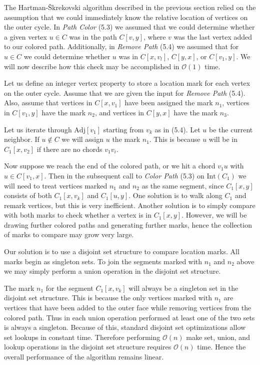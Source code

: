 \documentclass[letterpaper, 12pt]{article}
\theoremstyle{thm}
\begin{document}
The Hartman-\v{S}krekovski algorithm described in the previous section relied on the
assumption that we could immediately
know the relative location of vertices on the outer cycle. In
\textit{Path Color} (5.3) we assumed that we could determine
whether a given vertex $u\in C$ was in the path $C[v,y]$, where $v$ was the
last vertex added to our colored path. Additionally, in \textit{Remove Path}
(5.4) we assumed that for $u\in C$ we could determine whether $u$ was in $C[x,v_l]$,
$C[y,x]$, or $C[v_1,y]$. We will now describe how this check may be accomplished
in $\mathcal{O}(1)$ time.

Let us define an integer vertex property to store a location mark for each
vertex on the outer cycle. Assume that we are given the input for \textit{Remove
Path} (5.4). Also, assume that vertices in $C[x,v_1]$ have been assigned the mark $n_1$,
vertices in $C[v_1,y]$ have the mark $n_2$, and vertices in $C[y,x]$ have
the mark $n_3$.

Let us iterate through $\text{Adj}[v_1]$ starting from $v_k$ as in (5.4). Let
$u$ be the current neighbor. If $u\not\in C$ we will assign $u$ the mark $n_1$.
This is because $u$ will be in $C_1[x,v_2]$ if there are no chords $v_1v_i$.

Now suppose we reach the end of the colored path, or we hit a chord $v_1u$ with
$u\in C[v_1,x]$. Then in the subsequent call to \textit{Color Path} (5.3) on
$\text{Int}(C_1)$ we will need to treat vertices marked $n_1$ and $n_2$ as the
same segment, since $C_1[x,y]$ consists of both $C_1[x,v_k]$ and $C_1[u,y]$.
One solution is to walk along $C_1$ and remark vertices, but this is very
inefficient. Another solution is to simply compare with both marks to check
whether a vertex is in $C_1[x,y]$. However, we will be drawing further colored
paths and generating further marks, hence the collection of marks to compare
may grow very large.

Our solution is to use a disjoint set structure to compare location marks. All
marks begin as singleton sets. To join the segments marked with $n_1$ and
$n_2$ above we may simply perform a union operation in the disjoint set structure.

The mark $n_1$ for the segment $C_1[x,v_k]$ will always be a singleton set in the
disjoint set structure. This is because the only vertices marked with $n_1$ are
vertices that have been added to the outer face while removing vertices from the
colored path. Thus in each union operation performed at least one of the two sets
is always a singleton. Because of this, standard disjoint set optimizations
allow set lookups in constant time. Therefore performing
$\mathcal{O}(n)$ make set, union, and lookup operations in the disjoint set
structure requires $\mathcal{O}(n)$ time. Hence the overall performance of the
algorithm remains linear.
\end{document}
